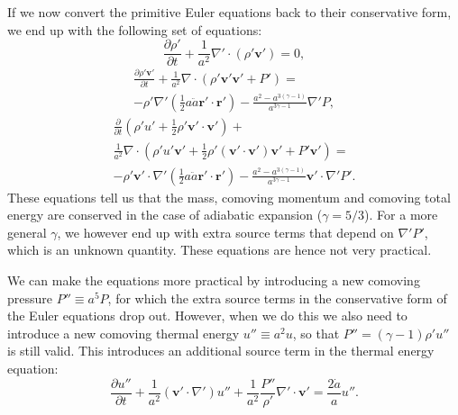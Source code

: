 If we now convert the primitive Euler equations back to their conservative form,
we end up with the following set of equations:
\begin{equation}
\frac{\partial{} \rho{}'}{\partial{} t} + \frac{1}{a^2} \nabla{}' \cdot \left(
\rho{}' \mathbf{v}' \right) = 0,
\end{equation}
\begin{multline}
\frac{\partial{} \rho{}' \mathbf{v}'}{\partial{} t} + \frac{1}{a^2}
\nabla{} \cdot \left( \rho{}' \mathbf{v}'\mathbf{v}' + P' \right) = \\
- \rho{}' \nabla{}' \left( \frac{1}{2} a \ddot{a} \mathbf{r}'\cdot\mathbf{r}'
\right) - \frac{a^2 - a^{3(\gamma{}-1)}}{a^{3\gamma{} - 1}} \nabla{}'P,
\end{multline}
\begin{multline}
\frac{\partial{}}{\partial{} t} \left( \rho{}' u' + \frac{1}{2} \rho{}'
\mathbf{v}'\cdot\mathbf{v}' \right) +\\
\frac{1}{a^2}\nabla{} \cdot \left( \rho{}' u' \mathbf{v}' +
\frac{1}{2} \rho{}' \left(\mathbf{v}'\cdot \mathbf{v}'\right)
\mathbf{v}' + P' \mathbf{v}' \right) =\\
- \rho{}' \mathbf{v}'\cdot\nabla{}' \left( \frac{1}{2} a \ddot{a} \mathbf{r}'\cdot
\mathbf{r}' \right) - \frac{a^2 - a^{3(\gamma{}-1)}}{a^{3\gamma{} - 1}}
\mathbf{v}'\cdot\nabla{}'P'.
\end{multline}
These equations tell us that the mass, comoving momentum and comoving total
energy are conserved in the case of adiabatic expansion ($\gamma{} = 5/3$).
For a more general $\gamma{}$, we however end up with extra source terms that
depend on $\nabla{}'P'$, which is an unknown quantity. These equations are
hence not very practical.

We can make the equations more practical by introducing a new comoving pressure
$P'' \equiv a^5 P$, for which the extra source terms in the conservative form of
the Euler equations drop out. However, when we do this we also need to introduce
a new comoving thermal energy $u'' \equiv a^2 u$, so that
$P'' = (\gamma{}-1)\rho'u''$ is still valid. This introduces an additional
source term in the thermal energy equation:
\begin{equation}
\frac{\partial{} u''}{\partial{} t} + \frac{1}{a^2} \left( \mathbf{v}' \cdot
\nabla{}' \right) u'' +
\frac{1}{a^2} \frac{P''}{\rho{}'} \nabla{}' \cdot \mathbf{v}'
= \frac{2\dot{a}}{a} u''.
\end{equation}
